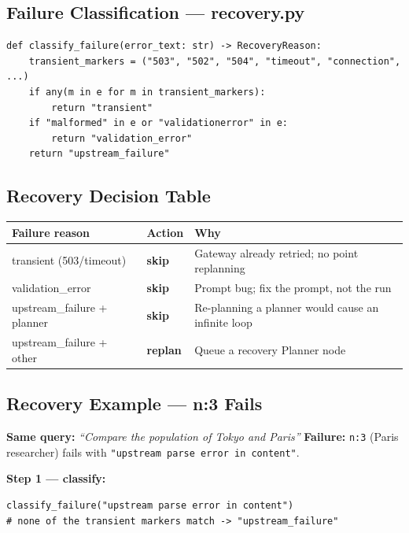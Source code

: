 \documentclass[12pt,a4paper]{article}
\begin{document}
\subsection{Failure Classification — recovery.py}

\begin{lstlisting}[style=pycode, caption={Failure classifier — recovery.py:29--43}]
def classify_failure(error_text: str) -> RecoveryReason:
    transient_markers = ("503", "502", "504", "timeout", "connection", ...)
    if any(m in e for m in transient_markers):
        return "transient"
    if "malformed" in e or "validationerror" in e:
        return "validation_error"
    return "upstream_failure"
\end{lstlisting}

\subsection{Recovery Decision Table}

\begin{center}
\begin{tabular}{p{4.5cm} >{\bfseries}p{2cm} p{6cm}}
\toprule
\textbf{Failure reason} & \textbf{Action} & \textbf{Why} \\
\midrule
transient (503/timeout)    & skip    & Gateway already retried; no point replanning \\
validation\_error           & skip    & Prompt bug; fix the prompt, not the run \\
upstream\_failure + planner & skip    & Re-planning a planner would cause an infinite loop \\
upstream\_failure + other   & \textcolor{keywordcolor}{replan} & Queue a recovery Planner node \\
\bottomrule
\end{tabular}
\end{center}

\subsection{Recovery Example — n:3 Fails}

\textbf{Same query:} \textit{``Compare the population of Tokyo and Paris''}
\textbf{Failure:} \texttt{n:3} (Paris researcher) fails with
\texttt{"upstream parse error in content"}.

\textbf{Step 1 — classify:}
\begin{lstlisting}[style=plaincode]
classify_failure("upstream parse error in content")
# none of the transient markers match -> "upstream_failure"
\end{lstlisting}
\end{document}
